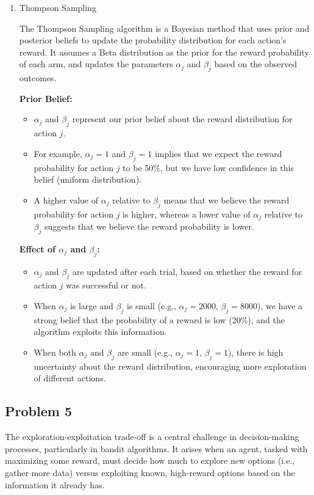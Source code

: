 \documentclass[11pt]{article}
\begin{document}
\begin{enumerate}[1.]
\item Thompson Sampling

The Thompson Sampling algorithm is a Bayesian method that uses prior and posterior beliefs to update the probability distribution for each action's reward. It assumes a Beta distribution as the prior for the reward probability of each arm, and updates the parameters \(\alpha_j\) and \(\beta_j\) based on the observed outcomes.

  \textbf{Prior Belief:}
    \begin{itemize}
        \item \(\alpha_j\) and \(\beta_j\) represent our prior belief about the reward distribution for action \(j\).
        \item For example, \(\alpha_j = 1\) and \(\beta_j = 1\) implies that we expect the reward probability for action \(j\) to be 50\%, but we have low confidence in this belief (uniform distribution).
        \item A higher value of \(\alpha_j\) relative to \(\beta_j\) means that we believe the reward probability for action \(j\) is higher, whereas a lower value of \(\alpha_j\) relative to \(\beta_j\) suggests that we believe the reward probability is lower.
    \end{itemize}

  \textbf{Effect of \(\alpha_j\) and \(\beta_j\):}
    \begin{itemize}
        \item \(\alpha_j\) and \(\beta_j\) are updated after each trial, based on whether the reward for action \(j\) was successful or not.
        \item When \(\alpha_j\) is large and \(\beta_j\) is small (e.g., \(\alpha_j = 2000\), \(\beta_j = 8000\)), we have a strong belief that the probability of a reward is low (20\%), and the algorithm exploits this information.
        \item When both \(\alpha_j\) and \(\beta_j\) are small (e.g., \(\alpha_j = 1\), \(\beta_j = 1\)), there is high uncertainty about the reward distribution, encouraging more exploration of different actions.
    \end{itemize}

\end{enumerate}


\newpage
\subsection{Problem 5}
The exploration-exploitation trade-off is a central challenge in decision-making processes, particularly in bandit algorithms. It arises when an agent, tasked with maximizing some reward, must decide how much to explore new options (i.e., gather more data) versus exploiting known, high-reward options based on the information it already has.
\end{document}
